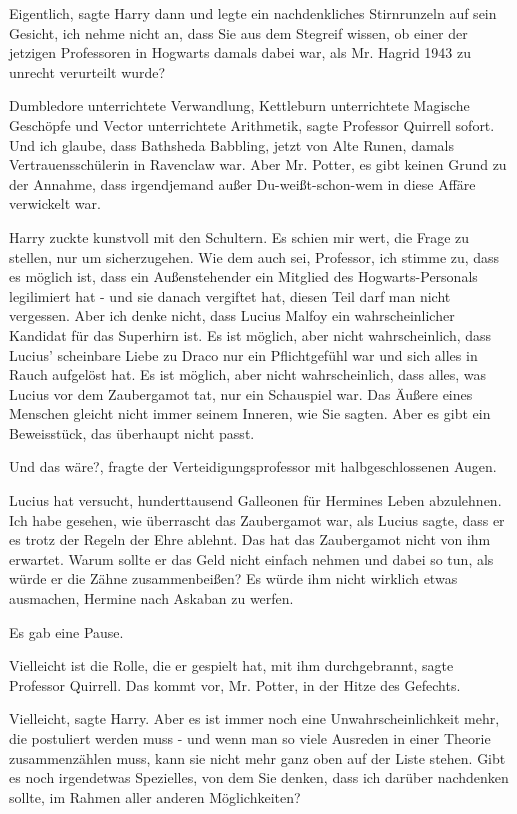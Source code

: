 \glqq{}Eigentlich\grqq{}, sagte Harry dann und legte ein nachdenkliches
Stirnrunzeln auf sein Gesicht, \glqq{}ich nehme nicht an, dass Sie aus dem
Stegreif wissen, ob einer der jetzigen Professoren in Hogwarts damals dabei war,
als Mr. Hagrid 1943 zu unrecht verurteilt wurde?\grqq{}

\glqq{}Dumbledore unterrichtete Verwandlung, Kettleburn unterrichtete Magische
Geschöpfe und Vector unterrichtete Arithmetik\grqq{}, sagte Professor Quirrell
sofort. \glqq{}Und ich glaube, dass Bathsheda Babbling, jetzt von Alte Runen,
damals Vertrauensschülerin in Ravenclaw war. Aber Mr. Potter, es gibt keinen
Grund zu der Annahme, dass irgendjemand außer Du-weißt-schon-wem in diese Affäre
verwickelt war.\grqq{}

Harry zuckte kunstvoll mit den Schultern. \glqq{}Es schien mir wert, die Frage zu
stellen, nur um sicherzugehen. Wie dem auch sei, Professor, ich stimme zu, dass
es möglich ist, dass ein Außenstehender ein Mitglied des Hogwarts-Personals
legilimiert hat - und sie danach vergiftet hat, diesen Teil darf man nicht
vergessen. Aber ich denke nicht, dass Lucius Malfoy ein wahrscheinlicher
Kandidat für das Superhirn ist. Es ist möglich, aber nicht wahrscheinlich, dass
Lucius' scheinbare Liebe zu Draco nur ein Pflichtgefühl war und sich alles in
Rauch aufgelöst hat. Es ist möglich, aber nicht wahrscheinlich, dass alles, was
Lucius vor dem Zaubergamot tat, nur ein Schauspiel war. Das Äußere eines
Menschen gleicht nicht immer seinem Inneren, wie Sie sagten. Aber es gibt ein
Beweisstück, das überhaupt nicht passt.\grqq{}

\glqq{}Und das wäre?\grqq{}, fragte der Verteidigungsprofessor mit
halbgeschlossenen Augen.

\glqq{}Lucius hat versucht, hunderttausend Galleonen für Hermines Leben
abzulehnen. Ich habe gesehen, wie überrascht das Zaubergamot war, als Lucius
sagte, dass er es trotz der Regeln der Ehre ablehnt. Das hat das Zaubergamot
nicht von ihm erwartet. Warum sollte er das Geld nicht einfach nehmen und dabei
so tun, als würde er die Zähne zusammenbeißen? Es würde ihm nicht wirklich etwas
ausmachen, Hermine nach Askaban zu werfen.\grqq{}

Es gab eine Pause.

\glqq{}Vielleicht ist die Rolle, die er gespielt hat, mit ihm
durchgebrannt\grqq{}, sagte Professor Quirrell. \glqq{}Das kommt vor, Mr. Potter,
in der Hitze des Gefechts.\grqq{}

\glqq{}Vielleicht\grqq{}, sagte Harry. \glqq{}Aber es ist immer noch eine
Unwahrscheinlichkeit mehr, die postuliert werden muss - und wenn man so viele
Ausreden in einer Theorie zusammenzählen muss, kann sie nicht mehr ganz oben auf
der Liste stehen. Gibt es noch irgendetwas Spezielles, von dem Sie denken, dass
ich darüber nachdenken sollte, im Rahmen aller anderen Möglichkeiten?\grqq{}

